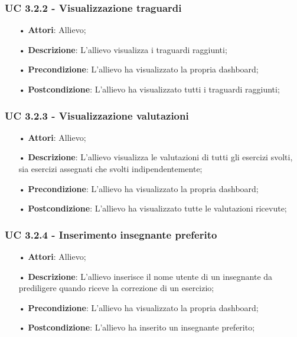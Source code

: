 \subsubsection{UC 3.2.2 - Visualizzazione traguardi}
\begin{itemize}
\item[•]\textbf{Attori}: Allievo;
\item[•]\textbf{Descrizione}: L'allievo visualizza i traguardi raggiunti;
\item[•]\textbf{Precondizione}: L'allievo ha visualizzato la propria {dashboard};
\item[•]\textbf{Postcondizione}: L'allievo ha visualizzato tutti i traguardi raggiunti;
\end{itemize}

\subsubsection{UC 3.2.3 - Visualizzazione valutazioni}
\begin{itemize}
\item[•]\textbf{Attori}: Allievo;
\item[•]\textbf{Descrizione}: L'allievo visualizza le valutazioni di tutti gli esercizi svolti, sia esercizi assegnati che svolti indipendentemente;
\item[•]\textbf{Precondizione}: L'allievo ha visualizzato la propria {dashboard};
\item[•]\textbf{Postcondizione}: L'allievo ha visualizzato tutte le valutazioni ricevute;
\end{itemize}

\subsubsection{UC 3.2.4 - Inserimento insegnante preferito}
\begin{itemize}
\item[•]\textbf{Attori}: Allievo;
\item[•]\textbf{Descrizione}: L'allievo inserisce il nome utente di un insegnante da prediligere quando riceve la correzione di un esercizio;
\item[•]\textbf{Precondizione}: L'allievo ha visualizzato la propria {dashboard};
\item[•]\textbf{Postcondizione}: L'allievo ha inserito un insegnante preferito;
\end{itemize}

